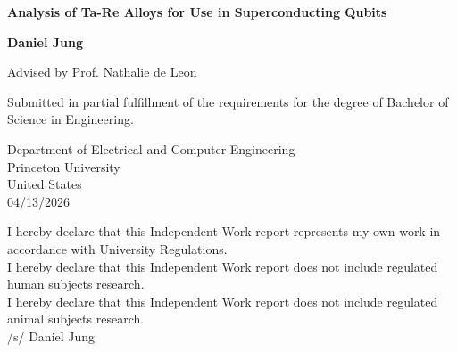 \documentclass[12pt]{article}
\begin{document}

\begin{titlepage}
   \begin{center}
       \vspace*{1cm}

        \Large
        \textbf{Analysis of Ta-Re Alloys for Use in Superconducting Qubits}

        \vspace*{1cm}
        \normalsize
        \textbf{Daniel Jung}

        \vspace{0.5cm}
        Advised by Prof. Nathalie de Leon
            
       \vspace{1.5cm}
 
       \vfill
            
       Submitted in partial fulfillment of the requirements for the degree of Bachelor of Science in Engineering.
            
       \vspace{0.8cm}
            
       Department of Electrical and Computer Engineering\\
       Princeton University\\
       United States\\
       04/13/2026
            
   \end{center}
\end{titlepage}


\newpage

\vspace{2cm}
\begin{center}
    I hereby declare that this Independent Work report represents my own work in accordance with University Regulations.\\
    \vspace{0.5cm}
    I hereby declare that this Independent Work report does not include regulated human subjects research.\\
    \vspace{0.5cm}
    I hereby declare that this Independent Work report does not include regulated animal subjects research.\\
    \vspace{0.5cm}
    /s/ Daniel Jung
\end{center}
\vfill
\end{document}
